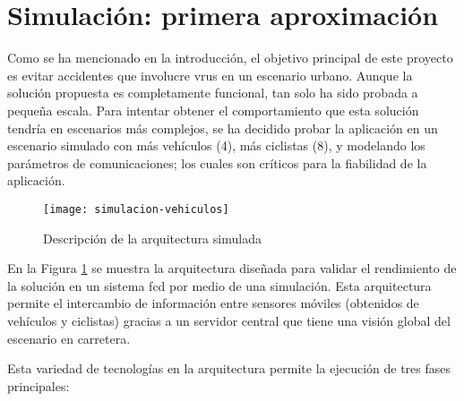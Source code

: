 \section{Simulación: primera aproximación}
Como se ha mencionado en la introducción, el objetivo principal de este
proyecto es evitar accidentes que involucre \gls{vru}s en un escenario urbano.
Aunque la solución propuesta es completamente funcional, tan solo ha sido
probada a pequeña escala. Para intentar obtener el comportamiento que esta
solución tendría en escenarios más complejos, se ha decidido probar la
aplicación en un escenario simulado con más vehículos (4), más ciclistas (8),
y modelando los parámetros de comunicaciones; los cuales son críticos para la
fiabilidad de la aplicación.

\begin{figure}[t]
	\texttt{[image: simulacion-vehiculos]}
	\caption{Descripción de la arquitectura simulada}
	\label{fig:simulacion-vehiculos}
\end{figure}

En la Figura \ref{fig:simulacion-vehiculos} se muestra la arquitectura diseñada
para validar el rendimiento de la solución en un sistema \gls{fcd} por medio de
una simulación. Esta arquitectura permite el intercambio de información entre
sensores móviles (obtenidos de vehículos y ciclistas) gracias a un servidor
central que tiene una visión global del escenario en carretera.

Esta variedad de tecnologías en la arquitectura permite la ejecución de tres
fases principales:

